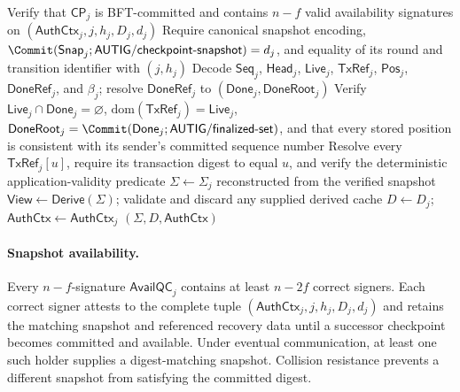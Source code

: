 \begin{algorithm}[h!]
\caption{\textsc{RecoverState}: Checkpoint Recovery and Committed Replay}
\label{alg:recover-state}
\footnotesize
{}
Verify that $\mathsf{CP}_j$ is BFT-committed and contains $n-f$ valid
availability signatures on $(\mathsf{AuthCtx}_j,j,h_j,D_j,d_j)$\;
Require canonical snapshot encoding,
$\Commit(\mathsf{Snap}_j;\mathsf{AUTIG/checkpoint\mbox{-}snapshot})=d_j$,
and equality of its round and transition identifier with $(j,h_j)$\;
Decode $\mathsf{Seq}_j$, $\mathsf{Head}_j$, $\mathsf{Live}_j$,
$\mathsf{TxRef}_j$, $\mathsf{Pos}_j$, $\mathsf{DoneRef}_j$, and $\beta_j$;
resolve $\mathsf{DoneRef}_j$ to
$(\mathsf{Done}_j,\mathsf{DoneRoot}_j)$\;
Verify $\mathsf{Live}_j\cap\mathsf{Done}_j=\varnothing$,
$\mathrm{dom}(\mathsf{TxRef}_j)=\mathsf{Live}_j$,
$\mathsf{DoneRoot}_j=\Commit(\mathsf{Done}_j;
\mathsf{AUTIG/finalized\mbox{-}set})$, and that every stored position is
consistent with its sender's committed sequence number\;
Resolve every $\mathsf{TxRef}_j[u]$, require its transaction digest to equal
$u$, and verify the deterministic application-validity predicate\;
$\Sigma\gets\Sigma_j$ reconstructed from the verified snapshot\;
$\mathsf{View}\gets\mathsf{Derive}(\Sigma)$; validate and discard any supplied
derived cache\;
$D\gets D_j$; $\mathsf{AuthCtx}\gets\mathsf{AuthCtx}_j$\;
\KwRet $(\Sigma,D,\mathsf{AuthCtx})$
\end{algorithm}

\paragraph{Snapshot availability.}
Every $n-f$-signature $\mathsf{AvailQC}_j$ contains at least $n-2f$ correct
signers.  Each correct signer attests to the complete tuple
$(\mathsf{AuthCtx}_j,j,h_j,D_j,d_j)$ and retains the matching snapshot and referenced
recovery data until a successor checkpoint becomes committed and available.  Under
eventual communication,
at least one such holder supplies a digest-matching snapshot.  Collision
resistance prevents a different snapshot from satisfying the committed
digest.


